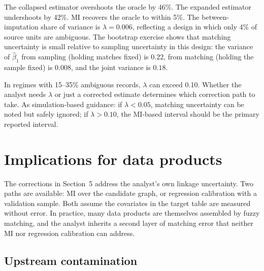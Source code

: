 \documentclass[12pt]{article}
\theoremstyle{remark}
\begin{document}
\begin{table}[ht]
\centering
\caption{Estimator comparison, medium-scale simulation ($K=40$, $n=600$).}
\label{tab:estimators}

\end{table}

\begin{table}[ht]
\centering
\caption{MI diagnostics via Rubin's rules ($M=200$ draws).}
\label{tab:mi_diag}

\end{table}

\begin{table}[ht]
\centering
\caption{Bootstrap variance decomposition ($B=200$ replicates).}
\label{tab:variance_decomp}

\end{table}

The collapsed estimator overshoots the oracle by 46\%. The expanded estimator undershoots by 42\%. MI recovers the oracle to within 5\%. The between-imputation share of variance is $\lambda = 0.006$, reflecting a design in which only 4\% of source units are ambiguous. The bootstrap exercise shows that matching uncertainty is small relative to sampling uncertainty in this design: the variance of $\hat\beta_1$ from sampling (holding matches fixed) is $0.22$, from matching (holding the sample fixed) is $0.008$, and the joint variance is $0.18$.

In regimes with 15--35\% ambiguous records, $\lambda$ can exceed 0.10. Whether the analyst needs $\lambda$ or just a corrected estimate determines which correction path to take. As simulation-based guidance: if $\lambda < 0.05$, matching uncertainty can be noted but safely ignored; if $\lambda > 0.10$, the MI-based interval should be the primary reported interval.

\section{Implications for data products}

The corrections in Section~5 address the analyst's own linkage uncertainty. Two paths are available: MI over the candidate graph, or regression calibration with a validation sample. Both assume the covariates in the target table are measured without error. In practice, many data products are themselves assembled by fuzzy matching, and the analyst inherits a second layer of matching error that neither MI nor regression calibration can address.

\subsection{Upstream contamination}
\end{document}
